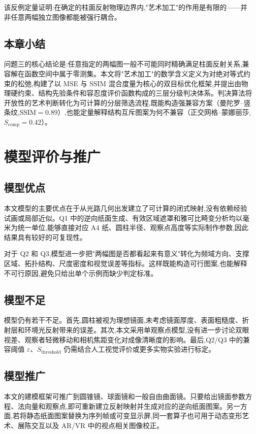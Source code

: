 \documentclass[12pt, a4paper]{ctexart}
\begin{document}
该反例定量证明:在确定的柱面反射物理边界内,"艺术加工"的作用是有限的——并非任意两幅独立图像都能被强行耦合。

\subsection{本章小结}

问题三的核心结论是:任意指定的两幅图一般不可能同时精确满足柱面反射关系,兼容解在函数空间中属于零测集。本文将"艺术加工"的数学含义定义为对绝对等式约束的松弛,构建了以 MSE 与 SSIM 混合度量为核心的双目标优化框架,并提出由物理硬约束、结构先验条件和容忍度评价函数构成的三层分级判决体系。判决算法将开放性的艺术判断转化为可计算的分层筛选流程,既能构造强兼容方案（曼陀罗–竖条纹,$\mathrm{SSIM} = 0.89$）,也能定量解释结构互斥图案为何不兼容（正交网格–蒙娜丽莎,$S_{\mathrm{comp}} = 0.42$）。

\section{模型评价与推广}
\subsection{模型优点}
本文模型的主要优点在于从光路几何出发建立了可计算的闭式映射,没有依赖经验试画或局部近似。Q1 中的逆向纸面生成、有效区域遮罩和雅可比畸变分析均以毫米为统一单位,能够直接对应 A4 纸、圆柱半径、观察点高度等实际制作参数,因此结果具有较好的可复现性。

对于 Q2 和 Q3,模型进一步把"两幅图是否都看起来有意义"转化为频域方向、支撑区域、拓扑结构、尺度密度和视觉误差等指标。这样既能构造可行图案,也能解释不可行原因,避免只给出单个示例而缺少判定标准。

\subsection{模型不足}
模型仍有若干不足。首先,圆柱被视为理想镜面,未考虑镜面厚度、表面粗糙度、折射层和环境光反射带来的误差。其次,本文采用单观察点模型,没有进一步讨论双眼视差、观察者轻微移动和相机焦距变化对成像清晰度的影响。最后,Q2/Q3 中的兼容阈值 $\varepsilon$、$S_{\mathrm{threshold}}$ 仍需结合人工视觉评价或更多实物实验进行标定。

\subsection{模型推广}
本文的建模框架可推广到圆锥镜、球面镜和一般自由曲面镜。只要给出镜面参数方程、法向量和观察点,即可重新建立反射映射并生成对应的逆向纸面图案。另一方面,若将静态纸面图案替换为序列帧或可变显示屏,同一套算子也可用于动态变形艺术、展陈交互以及 AR/VR 中的视点相关图像校正。
\end{document}
